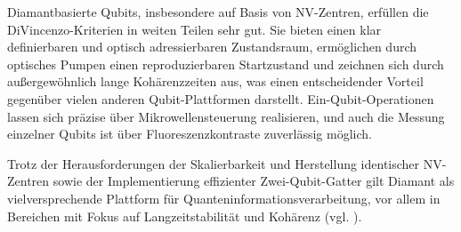 Diamantbasierte Qubits, insbesondere auf Basis von NV-Zentren, erfüllen die DiVincenzo-Kriterien in weiten Teilen sehr gut. Sie bieten einen klar definierbaren und optisch adressierbaren Zustandsraum, ermöglichen durch optisches Pumpen einen reproduzierbaren Startzustand und zeichnen sich durch außergewöhnlich lange Kohärenzzeiten aus, was einen entscheidender Vorteil gegenüber vielen anderen Qubit-Plattformen darstellt. Ein-Qubit-Operationen lassen sich präzise über Mikrowellensteuerung realisieren, und auch die Messung einzelner Qubits ist über Fluoreszenzkontraste zuverlässig möglich.  


Trotz der Herausforderungen der Skalierbarkeit und Herstellung identischer NV-Zentren sowie der Implementierung effizienter Zwei-Qubit-Gatter gilt Diamant als vielversprechende Plattform für Quanteninformationsverarbeitung, vor allem in Bereichen mit Fokus auf Langzeitstabilität und Kohärenz (vgl. \cite{ulanov_diamantbasierte_2025}).


\printbibliography
